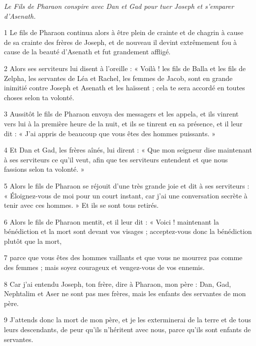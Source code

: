 \par \textit{Le Fils de Pharaon conspire avec Dan et Gad pour tuer Joseph et s'emparer d'Asenath.}


\par 1 Le fils de Pharaon continua alors à être plein de crainte et de chagrin à cause de sa crainte des frères de Joseph, et de nouveau il devint extrêmement fou à cause de la beauté d'Asenath et fut grandement affligé.

\par 2 Alors ses serviteurs lui disent à l'oreille : « Voilà ! les fils de Balla et les fils de Zelpha, les servantes de Léa et Rachel, les femmes de Jacob, sont en grande inimitié contre Joseph et Asenath et les haïssent ; cela te sera accordé en toutes choses selon ta volonté.

\par 3 Aussitôt le fils de Pharaon envoya des messagers et les appela, et ils vinrent vers lui à la première heure de la nuit, et ils se tinrent en sa présence, et il leur dit : « J’ai appris de beaucoup que vous êtes des hommes puissants. »

\par 4 Et Dan et Gad, les frères aînés, lui dirent : « Que mon seigneur dise maintenant à ses serviteurs ce qu'il veut, afin que tes serviteurs entendent et que nous fassions selon ta volonté. »

\par 5 Alors le fils de Pharaon se réjouit d'une très grande joie et dit à ses serviteurs : « Éloignez-vous de moi pour un court instant, car j'ai une conversation secrète à tenir avec ces hommes. » Et ils se sont tous retirés.

\par 6 Alors le fils de Pharaon mentit, et il leur dit : « Voici ! maintenant la bénédiction et la mort sont devant vos visages ; acceptez-vous donc la bénédiction plutôt que la mort,

\par 7 parce que vous êtes des hommes vaillants et que vous ne mourrez pas comme des femmes ; mais soyez courageux et vengez-vous de vos ennemis.

\par 8 Car j'ai entendu Joseph, ton frère, dire à Pharaon, mon père : Dan, Gad, Nephtalim et Aser ne sont pas mes frères, mais les enfants des servantes de mon père.

\par 9 J'attends donc la mort de mon père, et je les exterminerai de la terre et de tous leurs descendants, de peur qu'ils n'héritent avec nous, parce qu'ils sont enfants de servantes.


